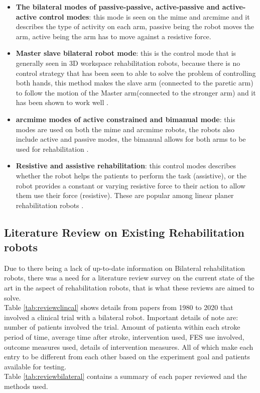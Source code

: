 \begin{itemize}\label{list:scontrol}%
	\item \textbf{The bilateral modes of passive-passive, active-passive and active-active control modes}: this mode is seen on the \ac{mime} and \ac{arcmime} and it describes the type of activity on each arm, passive being the robot moves the arm, active being the arm has to move against a resistive force.
	\item \textbf{Master slave bilateral robot mode}: this is the control mode that is generally seen in 3D workspace rehabilitation robots, because there is no control strategy that has been seen to able to solve the problem of controlling both hands, this method makes the slave arm (connected to the paretic arm) to follow the motion of the Master arm(connected to the stronger arm) and it has been shown to work well \cite{Guo2013,Harischandra2017,Liu2010,Lott2016,Sheng2018,Shen2019a}.
	\item\textbf{ \ac{arcmime} modes of active constrained and bimanual mode}: this modes are used on both the \ac{mime} and \ac{arcmime} robots, the robots also include active and passive modes, the bimanual allows for both arms to be used for rehabilitation \cite{Mahoney2003,Waldner2009}.
	\item \textbf{Resistive and assistive rehabilitation}: this control modes describes whether the robot helps the patients to perform the task (assistive), or the robot provides a constant or varying resistive force to their action to allow them use their force (resistive). These are popular among linear planer rehabilitation robots \cite{Haghshenas-Jaryani2020,Zollo2011}.
\end{itemize}


\newpage
\subsection{Literature Review on Existing Rehabilitation robots}
Due to there being a lack of up-to-date information on Bilateral rehabilitation robots, there was a need for a literature review survey on the current state of the art in the aspect of  rehabilitation robots, that is what these reviews are aimed to solve. \\
Table \ref{tab:reviewclincal} shows details from papers from 1980 to 2020 that involved a clinical trial with a bilateral robot. Important details of note are: number of patients involved the trial. Amount of patienta within each stroke period of time, average time after stroke, intervention used, FES use involved, outcome measures used, details of intervention measures. All of which make each entry to be different from each other based on the experiment goal and patients available for testing.\\
Table \ref{tab:reviewbilateral} contains a summary of each paper reviewed and  the methods used.

